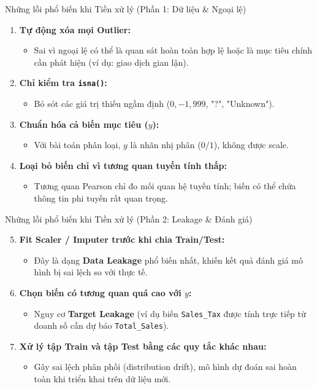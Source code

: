 \documentclass[aspectratio=169,11pt]{beamer}
\newcommand{\code}[1]{\texttt{#1}}
\begin{document}
\begin{frame}{Những lỗi phổ biến khi Tiền xử lý (Phần 1: Dữ liệu \& Ngoại lệ)}
\begin{enumerate}
  \item \textbf{Tự động xóa mọi Outlier:}
  \begin{itemize}
    \item Sai vì ngoại lệ có thể là quan sát hoàn toàn hợp lệ hoặc là mục tiêu chính cần phát hiện (ví dụ: giao dịch gian lận).
  \end{itemize}
  \item \textbf{Chỉ kiểm tra \texttt{isna()}:}
  \begin{itemize}
    \item Bỏ sót các giá trị thiếu ngầm định ($0, -1, 999$, "?", "Unknown").
  \end{itemize}
  \item \textbf{Chuẩn hóa cả biến mục tiêu ($y$):}
  \begin{itemize}
    \item Với bài toán phân loại, $y$ là nhãn nhị phân ($0/1$), không được scale.
  \end{itemize}
  \item \textbf{Loại bỏ biến chỉ vì tương quan tuyến tính thấp:}
  \begin{itemize}
    \item Tương quan Pearson chỉ đo mối quan hệ tuyến tính; biến có thể chứa thông tin phi tuyến rất quan trọng.
  \end{itemize}
\end{enumerate}
\end{frame}

\begin{frame}{Những lỗi phổ biến khi Tiền xử lý (Phần 2: Leakage \& Đánh giá)}
\begin{enumerate}
  \setcounter{enumi}{4}
  \item \textbf{Fit Scaler / Imputer trước khi chia Train/Test:}
  \begin{itemize}
    \item Đây là dạng \textbf{Data Leakage} phổ biến nhất, khiến kết quả đánh giá mô hình bị sai lệch so với thực tế.
  \end{itemize}
  \item \textbf{Chọn biến có tương quan quá cao với $y$:}
  \begin{itemize}
    \item Nguy cơ \textbf{Target Leakage} (ví dụ biến \code{Sales\_Tax} được tính trực tiếp từ doanh số cần dự báo \code{Total\_Sales}).
  \end{itemize}
  \item \textbf{Xử lý tập Train và tập Test bằng các quy tắc khác nhau:}
  \begin{itemize}
    \item Gây sai lệch phân phối (distribution drift), mô hình dự đoán sai hoàn toàn khi triển khai trên dữ liệu mới.
  \end{itemize}
\end{enumerate}
\end{frame}
\end{document}
